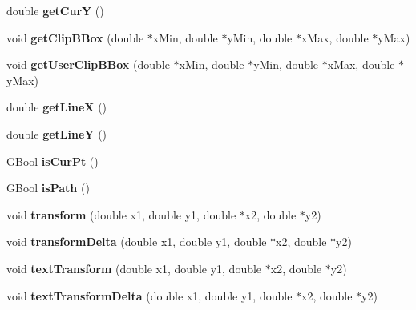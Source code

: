 \begin{DoxyCompactItemize}
double {\bfseries get\+CurY} ()
\item 
\mbox{\label{class_gfx_state_af076ce070529fc9924d802f52b9d0fa4}} 
void {\bfseries get\+Clip\+B\+Box} (double $\ast$x\+Min, double $\ast$y\+Min, double $\ast$x\+Max, double $\ast$y\+Max)
\item 
\mbox{\label{class_gfx_state_a4812956111d2417010b486191f5a289d}} 
void {\bfseries get\+User\+Clip\+B\+Box} (double $\ast$x\+Min, double $\ast$y\+Min, double $\ast$x\+Max, double $\ast$y\+Max)
\item 
\mbox{\label{class_gfx_state_a31bbcb1cd3711129dd77dfcab1a68c92}} 
double {\bfseries get\+LineX} ()
\item 
\mbox{\label{class_gfx_state_adf510ee323fce95421bd164bb927830c}} 
double {\bfseries get\+LineY} ()
\item 
\mbox{\label{class_gfx_state_ad16b208d7d6d18f42d5c7ec7ec947c7e}} 
G\+Bool {\bfseries is\+Cur\+Pt} ()
\item 
\mbox{\label{class_gfx_state_adb55352af588fea0c32156befc92bea6}} 
G\+Bool {\bfseries is\+Path} ()
\item 
\mbox{\label{class_gfx_state_af5eb72b976fad66abb80d9d8f76c46d3}} 
void {\bfseries transform} (double x1, double y1, double $\ast$x2, double $\ast$y2)
\item 
\mbox{\label{class_gfx_state_acefd1e421376d230af5d7fe162e4317f}} 
void {\bfseries transform\+Delta} (double x1, double y1, double $\ast$x2, double $\ast$y2)
\item 
\mbox{\label{class_gfx_state_ab6de99b7d58d38f340dcfdab51b9aa46}} 
void {\bfseries text\+Transform} (double x1, double y1, double $\ast$x2, double $\ast$y2)
\item 
\mbox{\label{class_gfx_state_a5e2a7de4681d328fe0b8781ada0725b7}} 
void {\bfseries text\+Transform\+Delta} (double x1, double y1, double $\ast$x2, double $\ast$y2)
\item 
\mbox{\label{class_gfx_state_a59cbcb09022b737f3628d4bef2218aa5}} 

\end{DoxyCompactItemize}
